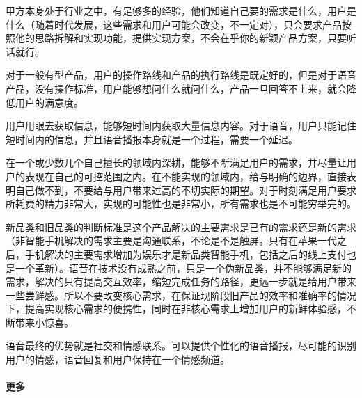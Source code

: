\documentclass[letterpaper,11pt,english]{sphinxmanual}
\begin{document}
甲方本身处于行业之中，有足够多的经验，他们知道自己要的需求是什么，用户是什么（随着时代发展，这些需求和用户可能会改变，不一定对），只会要求产品按照他的思路拆解和实现功能，提供实现方案，不会在乎你的新颖产品方案，只要听话就行。

对于一般有型产品，用户的操作路线和产品的执行路线是既定好的，但是对于语音产品，没有操作标准，用户能够想问什么就问什么，产品一旦回答不上来，就会降低用户的满意度。

用户用眼去获取信息，能够短时间内获取大量信息内容。对于语音，用户只能记住短时间内的信息，并且语音播报本身就是一个过程，需要一个延迟。


在一个或少数几个自己擅长的领域内深耕，能够不断满足用户的需求，并尽量让用户的表现在自己的可控范围之内。在不能实现的领域内，给与明确的边界，直接表明自己做不到，不要给与用户带来过高的不切实际的期望。对于时刻满足用户要求所耗费的精力非常大，实现的可能性也是非常小，所有需求也是不可能穷举完的。

新品类和旧品类的判断标准是这个产品解决的主要需求是已有的需求还是新的需求（非智能手机解决的需求主要是沟通联系，不论是不是触屏。只有在苹果一代之后，手机解决的主要需求增加为娱乐才是新品类智能手机，包括之后的线上支付也是一个革新）。语音在技术没有成熟之前，只是一个伪新品类，并不能够满足新的需求，解决的只有提高交互效率，缩短完成任务的路径，更远一步就是给用户带来一些尝鲜感。所以不要改变核心需求，在保证现阶段旧产品的效率和准确率的情况下，提高实现核心需求的便携性，同时在非核心需求上增加用户的新鲜体验感，不断带来小惊喜。

语音最终的优势就是社交和情感联系。可以提供个性化的语音播报，尽可能的识别用户的情感，语音回复和用户保持在一个情感频道。


\paragraph{更多}
\label{\detokenize{chapter_introduction/2B:id39}}
%
\begin{footnote}[67]\sphinxAtStartFootnote
{}
%
\end{footnote}
%
\begin{footnote}[68]\sphinxAtStartFootnote
{}
%
\end{footnote}
\end{document}
